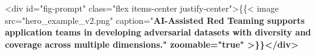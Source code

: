 <div id="fig-prompt" class="flex items-center justify-center">\{\{< image src="hero_example_v2.png" caption="\bf{AI-Assisted} Red Teaming supports application teams in developing adversarial datasets with diversity and coverage across multiple dimensions." zoomable="true" >\}\}</div>